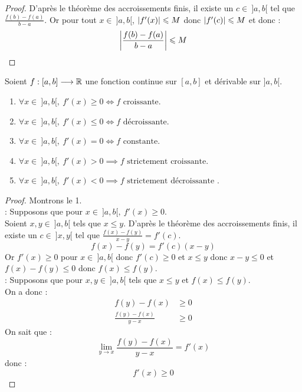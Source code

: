 \begin{proof}
	D'après le théorème des accroissements finis, il existe un $c \in \ ]a, b[$ tel que $\frac{f(b) - f(a)}{b - a}$. Or pour tout $x \in \ ]a, b[$, $\abs{f'(x)} \leqslant M$ donc $\abs{f'(c)} \leqslant M$ et donc :
	\[ \abs{\frac{f(b) - f(a)}{b - a}} \leqslant M \]
\end{proof}

\begin{proposition}
    Soient $f : [a, b] \longrightarrow \mathbb{R}$ une fonction continue sur $[a, b]$ et dérivable sur $]a, b[$.
    \begin{enumerate}
            \item $\forall x \in \ ]a, b[,\ f'(x) \geq 0 \iff f \text{ croissante}$.
            \item $\forall x \in \ ]a, b[,\ f'(x) \leq 0 \iff f \text{ décroissante}$.
            \item $\forall x \in \ ]a, b[,\ f'(x) = 0 \iff f \text{ constante}$.
            \item $\forall x \in \ ]a, b[,\ f'(x) > 0 \implies f \text{ strictement croissante}$.
            \item $\forall x \in \ ]a, b[,\ f'(x) < 0 \implies f \text{ strictement décroissante}$ .
        \end{enumerate}
\end{proposition}

\begin{proof}
	Montrons le 1. 
	\\
	\boxed{\implies} : Supposons que pour $x \in \ ]a, b[,\ f'(x) \geq 0$. \\
	Soient $x, y \in \ ]a, b[$ tels que $x \leq y$. D'après le théorème des accroissements finis, il existe un $c \in \ ]x, y[$ tel que $\frac{f(x) - f(y)}{x - y} = f'(c)$.
	\[ f(x) - f(y) = f'(c)(x - y) \]
	Or $f'(x) \geq 0$ pour $x \in \ ]a, b[$ donc $f'(c) \geq 0$ et $x \leq y$ donc $x - y \leq 0$ et $f(x) - f(y) \leq 0$ donc  $f(x) \leq f(y)$.
	\\
	\boxed{\impliedby} : Supposons que pour $x, y \in \ ]a, b[$ tels que $x \leq y$ et $f(x) \leq f(y)$. \\
	On a donc :
	\begin{align*}
		f(y) - f(x) &\geq 0 \\
		\frac{f(y) - f(x)}{y - x} &\geq 0 
	\end{align*}
	On sait que :
	\[ \lim_{y \to x} \frac{f(y) - f(x)}{y - x} = f'(x) \]
	donc :
	\[ f'(x) \geq 0 \]
\end{proof}

